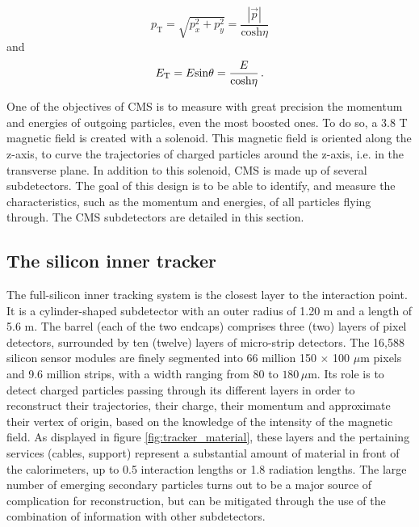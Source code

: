 \begin{equation}
    p_{\mathrm{T}} = \sqrt{p_{x}^2 + p_{y}^2} = \frac{|\Vec{p}|}{\mathrm{cosh} \eta}
\end{equation}
and 
\begin{equation}
    E_{\mathrm{T}} = E \mathrm{sin} \theta = \frac{E}{\mathrm{cosh} \eta} \mend
\end{equation}

One of the objectives of CMS is to measure with great precision the momentum and energies of outgoing particles, even the most boosted ones. To do so, a 3.8 T magnetic field is created with a solenoid. This magnetic field is oriented along the z-axis, to curve the trajectories of charged particles around the z-axis, i.e. in the transverse plane. In addition to this solenoid, CMS is made up of several subdetectors. The goal of this design is to be able to identify, and measure the characteristics, such as the momentum and energies, of all particles flying through. The CMS subdetectors are detailed in this section.

\subsection{The silicon inner tracker}

The full-silicon inner tracking system \cite{Karimäki:368412,CERN-LHCC-2000-016} is the closest layer to the interaction point. It is a cylinder-shaped subdetector with an outer radius of 1.20 m and a length of 5.6 m. The barrel (each of the two endcaps) comprises three (two) layers of pixel detectors, surrounded by ten (twelve) layers of micro-strip detectors. The 16,588 silicon sensor modules are finely segmented into 66 million 150 $\times$ 100 $\mu$m pixels and 9.6 million strips, with a width ranging from 80 to $180\,\mu\mathrm{m}$. Its role is to detect charged particles passing through its different layers in order to reconstruct their trajectories, their charge, their momentum and approximate their vertex of origin, based on the knowledge of the intensity of the magnetic field. As displayed in figure \ref{fig:tracker_material}, these layers and the pertaining services (cables, support) represent a substantial amount of material in front of the calorimeters, up to 0.5 interaction lengths or 1.8 radiation lengths. The large number of emerging secondary particles turns out to be a major source of complication for reconstruction, but can be mitigated through the use of the combination of information with other subdetectors.

